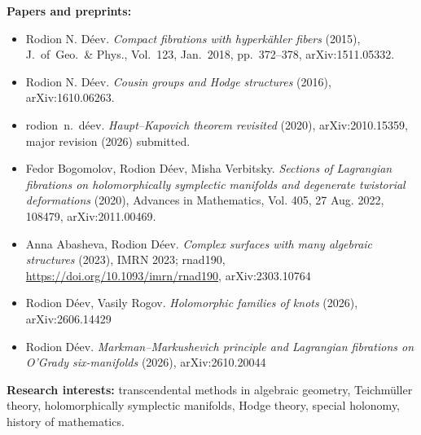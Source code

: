\documentclass{article}
\begin{document}
\begin{description}
\item {\bf Papers and preprints:} \begin{itemize}
     \item Rodion N. D\'eev. {\em 
     Compact fibrations with hyperk\"ahler fibers} (2015), J.~of~Geo.~\& Phys., 
     Vol.~123, Jan.~2018, pp.~372--378, arXiv:1511.05332.
     \item Rodion N. D\'eev. {\em
     Cousin groups and Hodge structures} (2016), arXiv:1610.06263.
     \item rodion~n.~d\'eev. {\em Haupt--Kapovich theorem revisited} (2020),
     arXiv:2010.15359, major revision (2026) submitted.
     \item Fedor Bogomolov, Rodion D\'eev, Misha Verbitsky. {\em 
     Sections of Lagrangian fibrations on holomorphically symplectic manifolds 
     and degenerate twistorial deformations} (2020),  Advances in Mathematics, 
     Vol.  405,  27 Aug.  2022,  108479,  arXiv:2011.00469.
     \item Anna Abasheva,  Rodion D\'eev.  {\em Complex surfaces with many 
     algebraic  structures} (2023),  IMRN 2023;  rnad190,  
     \url{https://doi.org/10.1093/imrn/rnad190},  arXiv:2303.10764
    \item Rodion D\'eev, Vasily Rogov. {\em Holomorphic families of knots} (2026),
    arXiv:2606.14429
    \item Rodion D\'eev. {\em Markman--Markushevich principle and Lagrangian
    fibrations on O'Grady six-manifolds} (2026), arXiv:2610.20044
\end{itemize}
\vspace{1mm}

\item {\bf Research interests:} transcendental methods in algebraic geometry, 
Teichm\"uller theory, holomorphically symplectic manifolds, Hodge theory, 
special holonomy, history of mathematics.

\end{description}
\end{document}
